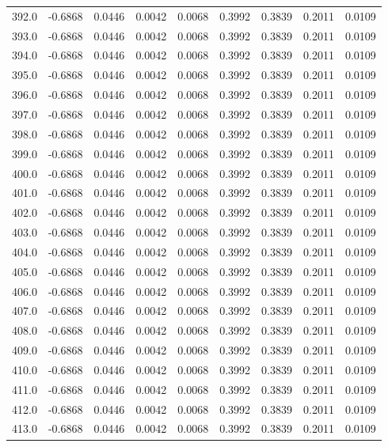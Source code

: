 \begin{longtable}{lrrrrrrrr}
392.0 & -0.6868 & 0.0446 & 0.0042 & 0.0068 & 0.3992 & 0.3839 & 0.2011 & 0.0109 \\
393.0 & -0.6868 & 0.0446 & 0.0042 & 0.0068 & 0.3992 & 0.3839 & 0.2011 & 0.0109 \\
394.0 & -0.6868 & 0.0446 & 0.0042 & 0.0068 & 0.3992 & 0.3839 & 0.2011 & 0.0109 \\
395.0 & -0.6868 & 0.0446 & 0.0042 & 0.0068 & 0.3992 & 0.3839 & 0.2011 & 0.0109 \\
396.0 & -0.6868 & 0.0446 & 0.0042 & 0.0068 & 0.3992 & 0.3839 & 0.2011 & 0.0109 \\
397.0 & -0.6868 & 0.0446 & 0.0042 & 0.0068 & 0.3992 & 0.3839 & 0.2011 & 0.0109 \\
398.0 & -0.6868 & 0.0446 & 0.0042 & 0.0068 & 0.3992 & 0.3839 & 0.2011 & 0.0109 \\
399.0 & -0.6868 & 0.0446 & 0.0042 & 0.0068 & 0.3992 & 0.3839 & 0.2011 & 0.0109 \\
400.0 & -0.6868 & 0.0446 & 0.0042 & 0.0068 & 0.3992 & 0.3839 & 0.2011 & 0.0109 \\
401.0 & -0.6868 & 0.0446 & 0.0042 & 0.0068 & 0.3992 & 0.3839 & 0.2011 & 0.0109 \\
402.0 & -0.6868 & 0.0446 & 0.0042 & 0.0068 & 0.3992 & 0.3839 & 0.2011 & 0.0109 \\
403.0 & -0.6868 & 0.0446 & 0.0042 & 0.0068 & 0.3992 & 0.3839 & 0.2011 & 0.0109 \\
404.0 & -0.6868 & 0.0446 & 0.0042 & 0.0068 & 0.3992 & 0.3839 & 0.2011 & 0.0109 \\
405.0 & -0.6868 & 0.0446 & 0.0042 & 0.0068 & 0.3992 & 0.3839 & 0.2011 & 0.0109 \\
406.0 & -0.6868 & 0.0446 & 0.0042 & 0.0068 & 0.3992 & 0.3839 & 0.2011 & 0.0109 \\
407.0 & -0.6868 & 0.0446 & 0.0042 & 0.0068 & 0.3992 & 0.3839 & 0.2011 & 0.0109 \\
408.0 & -0.6868 & 0.0446 & 0.0042 & 0.0068 & 0.3992 & 0.3839 & 0.2011 & 0.0109 \\
409.0 & -0.6868 & 0.0446 & 0.0042 & 0.0068 & 0.3992 & 0.3839 & 0.2011 & 0.0109 \\
410.0 & -0.6868 & 0.0446 & 0.0042 & 0.0068 & 0.3992 & 0.3839 & 0.2011 & 0.0109 \\
411.0 & -0.6868 & 0.0446 & 0.0042 & 0.0068 & 0.3992 & 0.3839 & 0.2011 & 0.0109 \\
412.0 & -0.6868 & 0.0446 & 0.0042 & 0.0068 & 0.3992 & 0.3839 & 0.2011 & 0.0109 \\
413.0 & -0.6868 & 0.0446 & 0.0042 & 0.0068 & 0.3992 & 0.3839 & 0.2011 & 0.0109 \\

\end{longtable}
